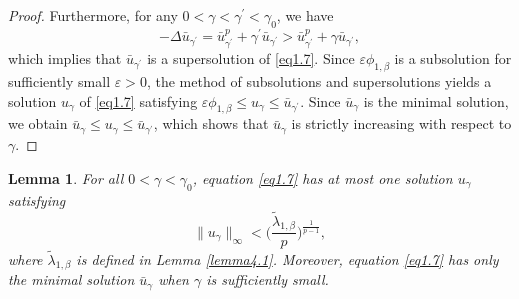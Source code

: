 \documentclass[12pt,reqno]{amsart}
\numberwithin{equation}{section}
\newtheorem{lemma}[theorem]{Lemma}
\theoremstyle{definition}
\begin{document}
\begin{proof}
Furthermore, for any $0<\gamma<\gamma^\prime<\gamma_0$, we have 
$$
-\Delta \bar{u}_{\gamma^\prime}=\bar{u}_{\gamma^\prime}^p+\gamma^\prime \bar{u}_{\gamma^\prime}>\bar{u}_{\gamma^\prime}^p+\gamma \bar{u}_{\gamma^\prime},
$$
which implies that $\bar{u}_{\gamma^\prime}$ is a supersolution of \eqref{eq1.7}. Since $\varepsilon\phi_{1,\beta}$ is a subsolution for sufficiently small $\varepsilon>0$, the method of subsolutions and supersolutions yields a solution $u_\gamma$ of \eqref{eq1.7} satisfying $\varepsilon\phi_{1,\beta}\le u_\gamma\le \bar{u}_{\gamma^\prime}$. Since $\bar{u}_\gamma$ is the minimal solution, we obtain $\bar{u}_\gamma\le u_\gamma\le \bar{u}_{\gamma^\prime}$, which shows that $\bar{u}_\gamma$ is strictly increasing with respect to $\gamma$.
\end{proof}


\begin{lemma}\label{lemma4.3}
For all $0<\gamma<\gamma_0$, equation \eqref{eq1.7} has at most one solution $u_\gamma$ satisfying
\begin{equation}\label{m3}
\|u_\gamma\|_\infty<\Big(\frac{\tilde{\lambda}_{1,\beta}}{p}\Big)^{\frac{1}{p-1}},
\end{equation}
where $\tilde{\lambda}_{1,\beta}$ is defined in Lemma \ref{lemma4.1}. Moreover, equation \eqref{eq1.7} has only the minimal solution $\bar{u}_\gamma$ when $\gamma$ is sufficiently small. 
\end{lemma}
\end{document}
